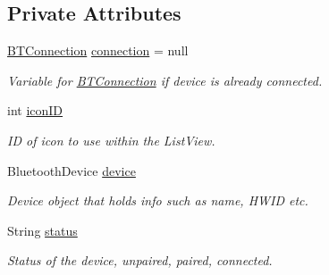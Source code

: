 \subsection*{Private Attributes}
\begin{DoxyCompactItemize}
\item 
\mbox{\label{class_android_app_1_1_b_t_device_item_a9a95ded58a8607664d020946e4e38364}} 
\hyperlink{class_android_app_1_1_b_t_connection}{B\+T\+Connection} \hyperlink{class_android_app_1_1_b_t_device_item_a9a95ded58a8607664d020946e4e38364}{connection} = null
\begin{DoxyCompactList}\small\item\em Variable for \hyperlink{class_android_app_1_1_b_t_connection}{B\+T\+Connection} if device is already connected. \end{DoxyCompactList}\item 
\mbox{\label{class_android_app_1_1_b_t_device_item_aa008dfacbd2f948952a14bed413d5969}} 
int \hyperlink{class_android_app_1_1_b_t_device_item_aa008dfacbd2f948952a14bed413d5969}{icon\+ID}
\begin{DoxyCompactList}\small\item\em ID of icon to use within the List\+View. \end{DoxyCompactList}\item 
\mbox{\label{class_android_app_1_1_b_t_device_item_a3f62f8de1d815f2e4f59030565ba29a1}} 
Bluetooth\+Device \hyperlink{class_android_app_1_1_b_t_device_item_a3f62f8de1d815f2e4f59030565ba29a1}{device}
\begin{DoxyCompactList}\small\item\em Device object that holds info such as name, H\+W\+ID etc. \end{DoxyCompactList}\item 
\mbox{\label{class_android_app_1_1_b_t_device_item_a53c37efab7ea4550d4db428b3d6915e0}} 
String \hyperlink{class_android_app_1_1_b_t_device_item_a53c37efab7ea4550d4db428b3d6915e0}{status}
\begin{DoxyCompactList}\small\item\em Status of the device, unpaired, paired, connected. \end{DoxyCompactList}\end{DoxyCompactItemize}


